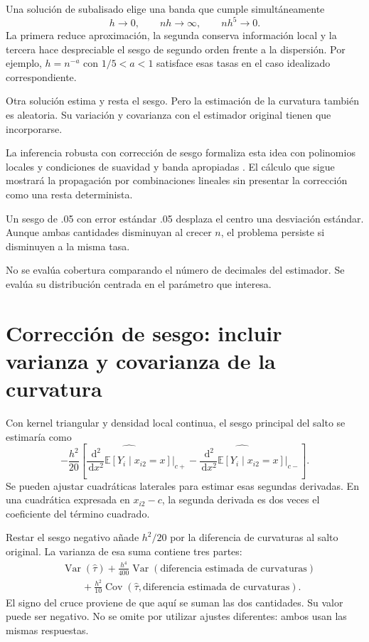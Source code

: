 \documentclass[11pt,a4paper]{article}
\newcommand{\E}{\mathbb E}
\newcommand{\dd}{\,\mathrm d}
\DeclareMathOperator{\Var}{Var}
\DeclareMathOperator{\Cov}{Cov}
\begin{document}
Una solución de subalisado elige una
banda que cumple simultáneamente
\[
h\to0,\qquad nh\to\infty,\qquad nh^5\to0.
\]
La primera reduce aproximación,
la segunda conserva información local
y la tercera hace despreciable
el sesgo de segundo orden frente a la dispersión.
Por ejemplo, \(h=n^{-a}\) con
\(1/5<a<1\) satisface esas tasas
en el caso idealizado correspondiente.

Otra solución estima y resta el sesgo.
Pero la estimación de la curvatura
también es aleatoria.
Su variación y covarianza con el
estimador original tienen que incorporarse.

La inferencia robusta con corrección
de sesgo formaliza esta idea
con polinomios locales y condiciones
de suavidad y banda apropiadas \cite{cct2014}.
El cálculo que sigue mostrará
la propagación por combinaciones lineales
sin presentar la corrección como
una resta determinista.

\begin{ejemplo}[Desplazamiento]
Un sesgo de .05 con error estándar .05
desplaza el centro una desviación estándar.
Aunque ambas cantidades disminuyan al crecer \(n\),
el problema persiste si disminuyen
a la misma tasa.
\end{ejemplo}
No se evalúa cobertura comparando
el número de decimales del estimador.
Se evalúa su distribución centrada
en el parámetro que interesa.

\clearpage
\section{Corrección de sesgo: incluir varianza y covarianza de la curvatura}\label{unidad37}
Con kernel triangular y densidad local continua,
el sesgo principal del salto se estimaría como
\[
-\frac{h^2}{20}\left[
\widehat{\frac{\dd^2}{\dd x^2}\E[Y_i\mid x_{i2}=x]}\bigg|_{c+}
-\widehat{\frac{\dd^2}{\dd x^2}\E[Y_i\mid x_{i2}=x]}\bigg|_{c-}
\right].
\]
Se pueden ajustar cuadráticas laterales
para estimar esas segundas derivadas.
En una cuadrática expresada en \(x_{i2}-c\),
la segunda derivada es dos veces
el coeficiente del término cuadrado.

Restar el sesgo negativo añade
\(h^2/20\) por la diferencia de curvaturas
al salto original.
La varianza de esa suma contiene tres partes:
\[
\begin{aligned}
&\Var(\widehat\tau)
+\frac{h^4}{400}\Var(\text{diferencia estimada de curvaturas})\\
&\qquad+\frac{h^2}{10}
\Cov(\widehat\tau,\text{diferencia estimada de curvaturas}).
\end{aligned}
\]
El signo del cruce proviene de
que aquí se suman las dos cantidades.
Su valor puede ser negativo.
No se omite por utilizar ajustes diferentes:
ambos usan las mismas respuestas.
\end{document}
